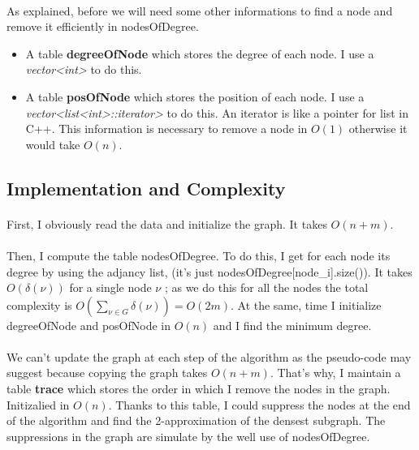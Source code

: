 \documentclass[english]{article}
\begin{document}
\begin{multicols}{2}
\paragraph{}
As explained, before we will need some other informations to find a node and remove it efficiently in nodesOfDegree.
\begin{itemize}
	\item A table {\bf degreeOfNode} which stores the degree of each node.
	\newline I use a {\it vector<int>} to do this.
	\item A table {\bf posOfNode} which stores the position of each node.
	\newline I use a {\it vector<list<int>::iterator>} to do this. An iterator is like a pointer for list in C++. This information is necessary to remove a node in $O(1)$ otherwise it would take $O(n)$.
\end{itemize}
\subsection{Implementation and Complexity}
\paragraph{}
First, I obviously read the data and initialize the graph. It takes $O(n+m)$. 
\paragraph{}
Then, I compute the table nodesOfDegree. To do this, I get for each node its degree by using the adjancy list, (it's just nodesOfDegree[node\_i].size()). It takes $O(\delta(\nu))$ for a single node $\nu$ ; as we do this for all the nodes the total complexity is $O(\sum_{\nu \in G} \delta(\nu)) = O(2m)$. At the same, time I initialize degreeOfNode and posOfNode in $O(n)$ and I find the minimum degree.
\paragraph{}
We can't update the graph at each step of the algorithm as the pseudo-code may suggest because copying the graph takes $O(n+m)$.
That's why, I maintain a table {\bf trace} which stores the order in which I remove the nodes in the graph. Initizalied in $O(n)$. Thanks to this table, I could suppress the nodes at the end of the algorithm and find the 2-approximation of the densest subgraph. The suppressions in the graph are simulate by the well use of nodesOfDegree. \hfill

\end{multicols}
\end{document}
